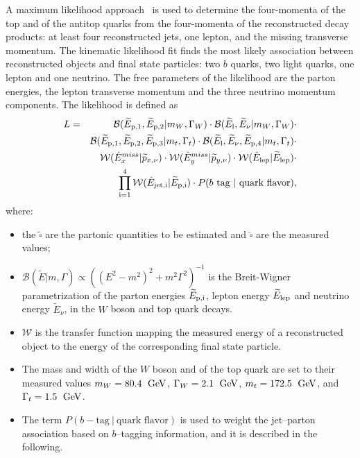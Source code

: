 A maximum likelihood approach~\cite{klfitter} is used to determine the
four-momenta of the top and of the antitop quarks from the four-momenta of
the reconstructed decay products: at least four reconstructed jets, one lepton, and the
missing transverse momentum. The kinematic likelihood fit finds the
most likely association between reconstructed objects and \ttbar{} final state particles:
two $b$ quarks, two light quarks, one lepton and one neutrino.
The free parameters of the likelihood are the parton energies, the
lepton transverse momentum and the three neutrino momentum components.
The likelihood is defined as
\begin{eqnarray}
L & = & \mathcal{B}(\widetilde{E}_{\rm{p,}1}, \widetilde{E}_{\rm{p,}2} | m_W,  \Gamma_W)
      \cdot \mathcal{B}(\widetilde{E}_{\rm l}, \widetilde{E}_{\nu} | m_W, \Gamma_W) \cdot \nonumber \\
           &   & \mathcal{B}(\widetilde{E}_{\rm{p,}1}, \widetilde{E}_{\rm{p,}2},     \widetilde{E}_{\rm{p,}3} | m_t, \Gamma_t)
                 \cdot \mathcal{B}(\widetilde{E}_{\rm l}, \widetilde{E}_{\nu},    \widetilde{E}_{\rm{p,}4} | m_t, \Gamma_t) \cdot \nonumber \\
           &   & \mathcal{W}( \hat{E}_{x}^{miss}| \widetilde{p}_{x, \nu})
                 \cdot \mathcal{W}(\hat{E}_{y}^{miss} |    \widetilde{p}_{y, \nu})
                 \cdot \mathcal{W}(\hat{E}_{\rm{lep}} | \widetilde{E}_{\rm{lep}}) \cdot \nonumber \\
           &   & \prod_{\rm{i=1}}^4 \mathcal{W}(\hat{E}_{\rm{jet,}i} | \widetilde{E}_{\rm{p,}i})
                 \cdot P(\textrm{$b$ tag} ~| ~\textrm{quark flavor}),
\label{eq:klflikelihood}
\end{eqnarray}
where:
\begin{itemize}
\item the $\widetilde{\square{}}$ are the partonic quantities to be estimated
       and $\hat{\square{}}$ are the measured values;
\item $\mathcal{B}(\widetilde{E}|m,\Gamma)\propto((E^2-m^2)^2+m^2\Gamma^2)^{-1}$ is
  the Breit-Wigner parametrization of the parton energies
  $\widetilde{E}_{\rm{p,}i}$, lepton energy $\widetilde{E}_{\rm{lep}}$
  and neutrino energy $\widetilde{E}_{\nu}$, in the $W$ boson and top quark decays.
\item $\mathcal{W}$ is the transfer function mapping the measured energy
      of a reconstructed object to the energy of the corresponding final state particle.
\item The mass and width of the $W$ boson and of the top quark are set
  to their measured values $m_W = 80.4~\; \mathrm{GeV}{}$, $\Gamma_W = 2.1~\; \mathrm{GeV}{}$, $m_t =
       172.5~\; \mathrm{GeV}{}$, and $\Gamma_t = 1.5~\; \mathrm{GeV}{}$. 
\item The term $P(b-\textrm{tag} ~| ~\textrm{quark flavor})$ is used
  to weight the jet--parton association based on $b$--tagging
  information, and it is described in the following.
\end{itemize}

